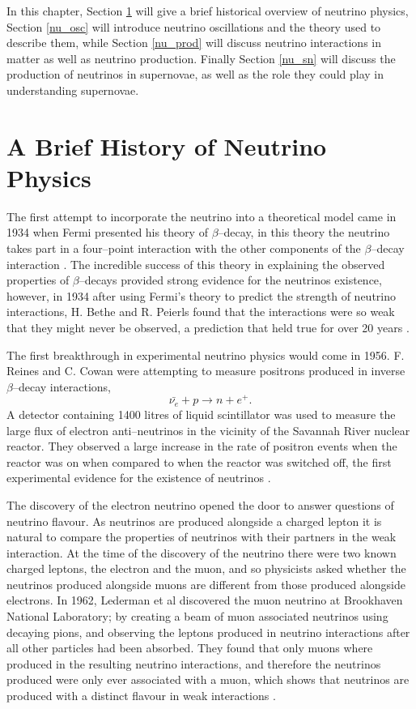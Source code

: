 In this chapter, Section \ref{nu_hist} will give a brief historical overview of 
neutrino physics, Section \ref{nu_osc} will introduce neutrino oscillations
and the theory used to describe them, while Section \ref{nu_prod} will discuss
neutrino interactions in matter as well as neutrino production. Finally Section
\ref{nu_sn} will discuss the production of neutrinos in supernovae, as well as
the role they could play in understanding supernovae.

\section{A Brief History of Neutrino Physics} \label{nu_hist}

The first attempt to incorporate the neutrino into a theoretical model came in
1934 when Fermi presented his theory of \(\beta\)--decay, in this theory the 
neutrino takes part in a four--point interaction with the other components of 
the \(\beta\)--decay interaction \cite{Fermi1934}. The incredible success of this 
theory in explaining the observed properties of \(\beta\)--decays provided 
strong evidence for the neutrinos existence, however, in 1934 after using 
Fermi's theory to predict the strength of neutrino interactions, H. Bethe and 
R. Peierls found that the interactions were so weak that they might never be 
observed, a prediction that held true for over 20 years \cite{Bethe1934}.

The first breakthrough in experimental neutrino physics would come in 1956. F.
Reines and C. Cowan were attempting to measure positrons produced in inverse 
\(\beta\)--decay interactions,
\begin{equation}
	\bar{\nu_e} + p \rightarrow n + e^+.
\end{equation}
A detector containing 1400 litres of liquid scintillator was used to measure the 
large flux of electron anti--neutrinos in the vicinity of the Savannah River 
nuclear reactor. They observed a large increase in the rate of positron events 
when the reactor was on when compared to when the reactor was switched off, the 
first experimental evidence for the existence of neutrinos \cite{Reines1953}. 

The discovery of the electron neutrino opened the door to answer questions of 
neutrino flavour. As neutrinos are produced alongside a charged lepton it is 
natural to compare the properties of neutrinos with their partners in the weak
interaction. At the time of the discovery of the neutrino there were two known
charged leptons, the electron and the muon, and so physicists asked whether the
neutrinos produced alongside muons are different from those produced alongside
electrons. In 1962, Lederman et al discovered the muon neutrino at Brookhaven
National Laboratory; by creating a beam of muon associated neutrinos using 
decaying pions, and observing the leptons produced in neutrino interactions 
after all other particles had been absorbed. They found that only muons where 
produced in the resulting neutrino interactions, and therefore the neutrinos 
produced were only ever associated with a muon, which shows that neutrinos are 
produced with a distinct flavour in weak interactions \cite{Danby1962}.

